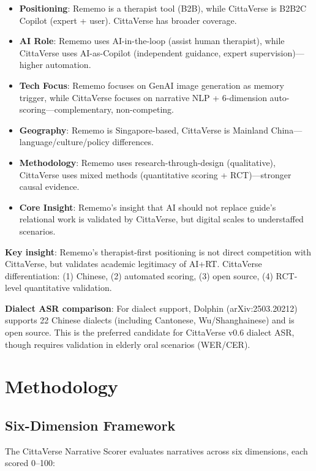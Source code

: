 \documentclass[11pt]{article}
\begin{document}
\begin{itemize}
    \item \textbf{Positioning}: Rememo is a therapist tool (B2B), while CittaVerse is B2B2C Copilot (expert + user). CittaVerse has broader coverage.
    \item \textbf{AI Role}: Rememo uses AI-in-the-loop (assist human therapist), while CittaVerse uses AI-as-Copilot (independent guidance, expert supervision)---higher automation.
    \item \textbf{Tech Focus}: Rememo focuses on GenAI image generation as memory trigger, while CittaVerse focuses on narrative NLP + 6-dimension auto-scoring---complementary, non-competing.
    \item \textbf{Geography}: Rememo is Singapore-based, CittaVerse is Mainland China---language/culture/policy differences.
    \item \textbf{Methodology}: Rememo uses research-through-design (qualitative), CittaVerse uses mixed methods (quantitative scoring + RCT)---stronger causal evidence.
    \item \textbf{Core Insight}: Rememo's insight that AI should not replace guide's relational work is validated by CittaVerse, but digital scales to understaffed scenarios.
\end{itemize}

\textbf{Key insight}: Rememo's therapist-first positioning is not direct competition with CittaVerse, but validates academic legitimacy of AI+RT. CittaVerse differentiation: (1) Chinese, (2) automated scoring, (3) open source, (4) RCT-level quantitative validation.

\textbf{Dialect ASR comparison}: For dialect support, Dolphin \citep{dolphin2025} (arXiv:2503.20212) supports 22 Chinese dialects (including Cantonese, Wu/Shanghainese) and is open source. This is the preferred candidate for CittaVerse v0.6 dialect ASR, though requires validation in elderly oral scenarios (WER/CER).

\section{Methodology}
\label{sec:methodology}

\subsection{Six-Dimension Framework}

The CittaVerse Narrative Scorer evaluates narratives across six dimensions, each scored 0--100:
\end{document}
